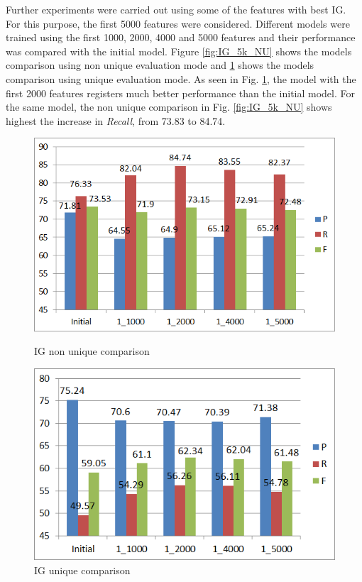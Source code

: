 Further experiments were carried out using some of the features with best IG. For this purpose, the first 5000 features were considered. Different models were trained using the first 1000, 2000, 4000 and 5000 features and their performance was compared with the initial model. Figure \ref{fig:IG_5k_NU} shows the models comparison using non unique evaluation mode and \ref{fig:IG_5k_U} shows the models comparison using unique evaluation mode. As seen in Fig. \ref{fig:IG_5k_U}, the model with the first 2000 features registers much better performance than the initial model. For the same model, the non unique comparison in Fig. \ref{fig:IG_5k_NU} shows highest the increase in \textit{Recall}, from 73.83 to 84.74.

\begin{figure}
\centering
\begin{minipage}{.5\textwidth}
  \centering
  \includegraphics[width=.95\textwidth]{figures/IGFirst5k_NU.png}
  \caption{IG non unique comparison}
  \label{fig:IG_5k_NU}
\end{minipage}%
\begin{minipage}{.5\textwidth}
  \centering
  \includegraphics[width=.95\textwidth]{figures/IGFirst5k_U.png}
  \caption{IG unique comparison}
  \label{fig:IG_5k_U}
\end{minipage}
\end{figure}


